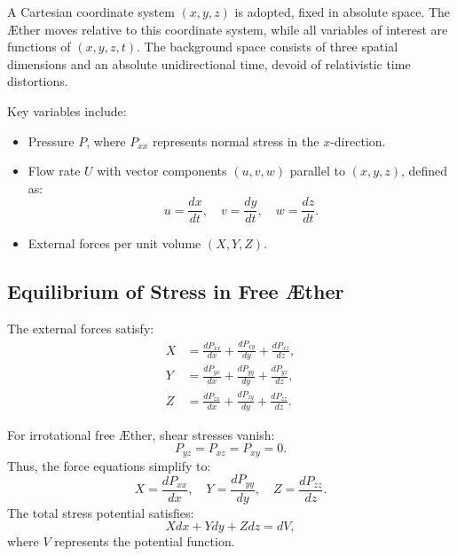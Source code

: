 \documentclass[a4paper,10pt]{article}
\begin{document}
    A Cartesian coordinate system $(x, y, z)$ is adopted, fixed in absolute space. The Æther moves relative to this coordinate system, while all variables of interest are functions of $(x, y, z, t)$. The background space consists of three spatial dimensions and an absolute unidirectional time, devoid of relativistic time distortions.

    Key variables include:
    \begin{itemize}
        \item Pressure $P$, where $P_{xx}$ represents normal stress in the $x$-direction.
        \item Flow rate $U$ with vector components $(u, v, w)$ parallel to $(x, y, z)$, defined as:
        \begin{equation*}
            u = \frac{dx}{dt}, \quad v = \frac{dy}{dt}, \quad w = \frac{dz}{dt}.
        \end{equation*}
        \item External forces per unit volume $(X, Y, Z)$.
    \end{itemize}

    \subsection*{Equilibrium of Stress in Free Æther}
    The external forces satisfy:
    \begin{align}
        X &= \frac{d P_{xx}}{dx} + \frac{d P_{xy}}{dy} + \frac{d P_{xz}}{dz}, \\
        Y &= \frac{d P_{yx}}{dx} + \frac{d P_{yy}}{dy} + \frac{d P_{yz}}{dz}, \\
        Z &= \frac{d P_{zx}}{dx} + \frac{d P_{zy}}{dy} + \frac{d P_{zz}}{dz}.
    \end{align}

    For irrotational free Æther, shear stresses vanish:
    \begin{equation*}
        P_{yz} = P_{xz} = P_{xy} = 0.
    \end{equation*}
    Thus, the force equations simplify to:
    \begin{equation*}
        X = \frac{d P_{xx}}{dx}, \quad Y = \frac{d P_{yy}}{dy}, \quad Z = \frac{d P_{zz}}{dz}.
    \end{equation*}
    The total stress potential satisfies:
    \begin{equation*}
        X dx + Y dy + Z dz = dV,
    \end{equation*}
    where $V$ represents the potential function.
\end{document}

